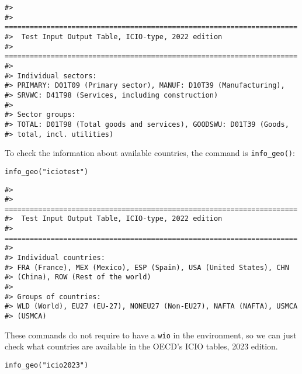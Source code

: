 \begin{verbatim}
#> 
#> ======================================================================
#>  Test Input Output Table, ICIO-type, 2022 edition
#> ======================================================================
#> 
#> Individual sectors:
#> PRIMARY: D01T09 (Primary sector), MANUF: D10T39 (Manufacturing),
#> SRVWC: D41T98 (Services, including construction)
#> 
#> Sector groups:
#> TOTAL: D01T98 (Total goods and services), GOODSWU: D01T39 (Goods,
#> total, incl. utilities)
\end{verbatim}

To check the information about available countries, the command is
\texttt{info\_geo()}:

\begin{verbatim}
info_geo("iciotest")
\end{verbatim}

\begin{verbatim}
#> 
#> ======================================================================
#>  Test Input Output Table, ICIO-type, 2022 edition
#> ======================================================================
#> 
#> Individual countries:
#> FRA (France), MEX (Mexico), ESP (Spain), USA (United States), CHN
#> (China), ROW (Rest of the world)
#> 
#> Groups of countries:
#> WLD (World), EU27 (EU-27), NONEU27 (Non-EU27), NAFTA (NAFTA), USMCA
#> (USMCA)
\end{verbatim}

These commands do not require to have a \texttt{wio} in the environment, so we
can just check what countries are available in the OECD's ICIO tables, 2023
edition.

\begin{verbatim}
info_geo("icio2023")
\end{verbatim}

